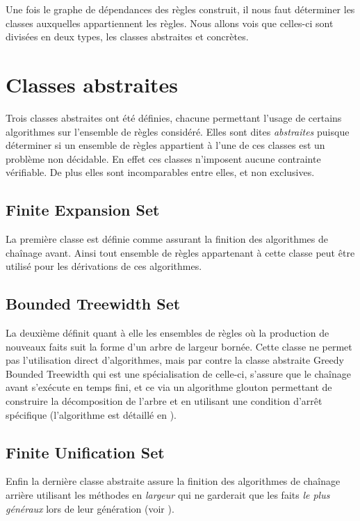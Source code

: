 
Une fois le graphe de dépendances des règles construit, il nous faut déterminer les
classes auxquelles appartiennent les règles. Nous allons vois que celles-ci sont divisées
en deux types, les classes abstraites et concrètes.

\section{Classes abstraites}\label{classes_abstraites}
Trois classes abstraites ont été définies, chacune permettant l'usage de certains
algorithmes sur l'ensemble de règles considéré.
Elles sont dites {\em abstraites} puisque déterminer si un ensemble de règles appartient
à l'une de ces classes est un problème non décidable. En effet ces classes n'imposent
aucune contrainte vérifiable.
De plus elles sont incomparables entre elles, et non exclusives. 

\subsection{Finite Expansion Set}\label{classes_abstraites_fus}
La première classe est définie comme assurant la finition des algorithmes de chaînage
avant. Ainsi tout ensemble de règles appartenant à cette classe peut être utilisé pour
les dérivations de ces algorithmes.

\subsection{Bounded Treewidth Set}\label{classes_abstraites_bts}
La deuxième définit quant à elle 
les ensembles de règles où la production de nouveaux faits suit la
forme d'un arbre de largeur bornée.
Cette classe ne permet pas l'utilisation direct d'algorithmes, mais par contre la classe
abstraite Greedy Bounded Treewidth qui est une spécialisation de celle-ci, s'assure que
le chaînage avant s'exécute en temps fini, et ce via un algorithme glouton permettant de
construire la décomposition de l'arbre et en utilisant une condition d'arrêt spécifique
(l'algorithme est détaillé en \cite{walking}).

\subsection{Finite Unification Set}\label{classes_abstraites_fes}
Enfin la dernière classe abstraite assure la finition des algorithmes de chaînage
arrière utilisant les méthodes en {\em largeur} qui ne garderait que les faits {\em le plus
généraux} lors de leur génération (voir \cite{ontological11}).


